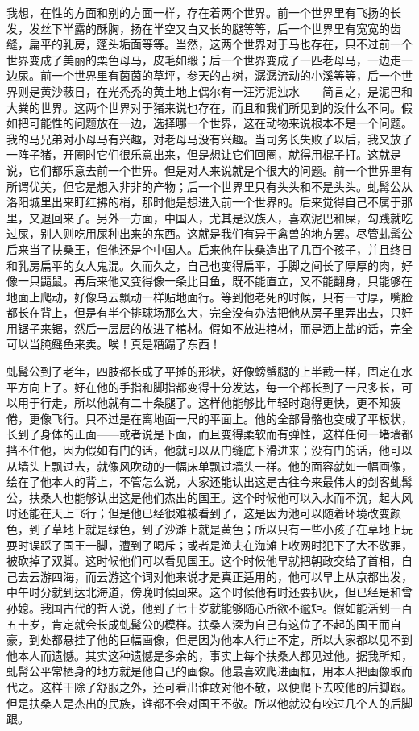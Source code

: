 我想，在性的方面和别的方面一样，存在着两个世界。前一个世界里有飞扬的长发，发丝下半露的酥胸，扬在半空又白又长的腿等等，后一个世界里有宽宽的齿缝，扁平的乳房，蓬头垢面等等。当然，这两个世界对于马也存在，只不过前一个世界变成了美丽的栗色母马，皮毛如缎；后一个世界变成了一匹老母马，一边走一边尿。前一个世界里有茵茵的草坪，参天的古树，潺潺流动的小溪等等，后一个世界则是黄沙蔽日，在光秃秃的黄土地上偶尔有一汪污泥浊水——简言之，是泥巴和大粪的世界。这两个世界对于猪来说也存在，而且和我们所见到的没什么不同。假如把可能性的问题放在一边，选择哪一个世界，这在动物来说根本不是一个问题。我的马兄弟对小母马有兴趣，对老母马没有兴趣。当司务长失败了以后，我又放了一阵子猪，开圈时它们很乐意出来，但是想让它们回圈，就得用棍子打。这就是说，它们都乐意去前一个世界。但是对人来说就是个很大的问题。前一个世界里有所谓优美，但它是想入非非的产物；后一个世界里只有头头和不是头头。虬髯公从洛阳城里出来盯红拂的梢，那时他是想进入前一个世界的。后来觉得自己不属于那里，又退回来了。另外一方面，中国人，尤其是汉族人，喜欢泥巴和屎，勾践就吃过屎，别人则吃用屎种出来的东西。这就是我们有异于禽兽的地方罢。尽管虬髯公后来当了扶桑王，但他还是个中国人。后来他在扶桑造出了几百个孩子，并且终日和乳房扁平的女人鬼混。久而久之，自己也变得扁平，手脚之间长了厚厚的肉，好像一只鼯鼠。再后来他又变得像一条比目鱼，既不能直立，又不能翻身，只能够在地面上爬动，好像乌云飘动一样贴地面行。等到他老死的时候，只有一寸厚，嘴脸都长在背上，但是有半个排球场那么大，完全没有办法把他从房子里弄出去，只好用锯子来锯，然后一层层的放进了棺材。假如不放进棺材，而是洒上盐的话，完全可以当腌鳐鱼来卖。唉！真是糟蹋了东西！ 

虬髯公到了老年，四肢都长成了平摊的形状，好像螃蟹腿的上半截一样，固定在水平方向上了。好在他的手指和脚指都变得十分发达，每一个都长到了一尺多长，可以用于行走，所以他就有二十条腿了。这样他能够比年轻时跑得更快，更不知疲倦，更像飞行。只不过是在离地面一尺的平面上。他的全部骨骼也变成了平板状，长到了身体的正面——或者说是下面，而且变得柔软而有弹性，这样任何一堵墙都挡不住他，因为假如有门的话，他就可以从门缝底下滑进来；没有门的话，他可以从墙头上飘过去，就像风吹动的一幅床单飘过墙头一样。他的面容就如一幅画像，绘在了他本人的背上，不管怎么说，大家还能认出这是古往今来最伟大的剑客虬髯公，扶桑人也能够认出这是他们杰出的国王。这个时候他可以入水而不沉，起大风时还能在天上飞行；但是他已经很难被看到了，这是因为池可以随着环境改变颜色，到了草地上就是绿色，到了沙滩上就是黄色；所以只有一些小孩子在草地上玩耍时误踩了国王一脚，遭到了喝斥；或者是渔夫在海滩上收网时犯下了大不敬罪，被砍掉了双脚。这时候他们可以看见国王。这个时候他早就把朝政交给了首相，自己去云游四海，而云游这个词对他来说才是真正适用的，他可以早上从京都出发，中午时分就到达北海道，傍晚时候回来。这个时候他有时还要扒灰，但已经是和曾孙媳。我国古代的哲人说，他到了七十岁就能够随心所欲不逾矩。假如能活到一百五十岁，肯定就会长成虬髯公的模样。扶桑人深为自己有这位了不起的国王而自豪，到处都悬挂了他的巨幅画像，但是因为他本人行止不定，所以大家都以见不到他本人而遗憾。其实这种遗憾是多余的，事实上每个扶桑人都见过他。据我所知，虬髯公平常栖身的地方就是他自己的画像。他最喜欢爬进画框，用本人把画像取而代之。这样干除了舒服之外，还可看出谁敢对他不敬，以便爬下去咬他的后脚跟。但是扶桑人是杰出的民族，谁都不会对国王不敬。所以他就没有咬过几个人的后脚跟。 

